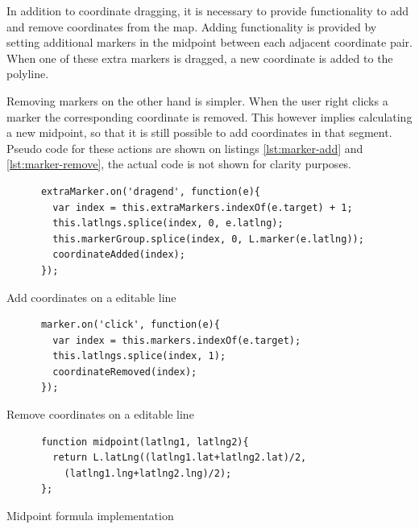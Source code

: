 In addition to coordinate dragging, it is necessary to provide functionality to add and remove coordinates from the map. Adding functionality is provided by setting additional markers in the midpoint between each adjacent coordinate pair. When one of these extra markers is dragged, a new coordinate is added to the polyline.

Removing markers on the other hand is simpler. When the user right clicks a marker the corresponding coordinate is removed. This however implies calculating a new midpoint, so that it is still possible to add coordinates in that segment. Pseudo code for these actions are shown on listings \ref{lst:marker-add} and \ref{lst:marker-remove}, the actual code is not shown for clarity purposes.


\begin{listing}[ht]\centering
  \begin{minipage}{.7\textwidth}
    \begin{verbatim}
      extraMarker.on('dragend', function(e){
        var index = this.extraMarkers.indexOf(e.target) + 1;
        this.latlngs.splice(index, 0, e.latlng);
        this.markerGroup.splice(index, 0, L.marker(e.latlng));
        coordinateAdded(index);
      });
    \end{verbatim}
  \end{minipage}
  \caption{Add coordinates on a editable line}\label{lst:marker-add}
\end{listing}

\begin{listing}[ht]\centering
  \begin{minipage}{.7\textwidth}
    \begin{verbatim}
      marker.on('click', function(e){
        var index = this.markers.indexOf(e.target);
        this.latlngs.splice(index, 1);
        coordinateRemoved(index);
      });
    \end{verbatim}
  \end{minipage}
  \caption{Remove coordinates on a editable line}\label{lst:marker-remove}
\end{listing}

\begin{listing}[ht]\centering
  \begin{minipage}{.7\textwidth}
    \begin{verbatim}
      function midpoint(latlng1, latlng2){
        return L.latLng((latlng1.lat+latlng2.lat)/2, 
          (latlng1.lng+latlng2.lng)/2);
      };
    \end{verbatim}
  \end{minipage}
  \caption{Midpoint formula implementation}\label{lst:midpoint}
\end{listing}

